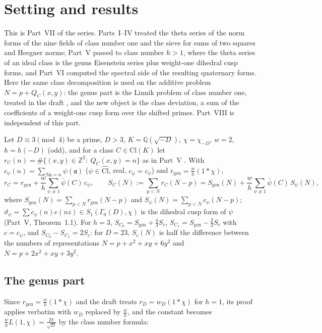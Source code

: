 \documentclass[11pt]{amsart}
\theoremstyle{remark}
\newcommand{\Z}{\mathbb Z}
\newcommand{\Q}{\mathbb Q}
\newcommand{\vt}{\vartheta}
\newcommand{\Cl}{\mathrm{Cl}}
\newcommand{\gen}{\mathrm{gen}}
\begin{document}
\begin{abstract}
$P_3$ according to the parity of $N$ and $\chi(2)$, unconditionally; only the problem for every individual $N$ remains.
\end{abstract}
\maketitle

\section{Setting and results}

This is Part~VII of the series. Parts~I--IV treated the theta series of the norm forms of the nine fields of class number one and the sieve for sums of two squares and Heegner norms; Part~V \cite{ChenV} passed to class number $h>1$, where the theta series of an ideal class is the genus Eisenstein series plus weight-one dihedral cusp forms, and Part~VI \cite{ChenVI} computed the spectral side of the resulting quaternary forms. Here the same class decomposition is used on the additive problem $N=p+Q_C(x,y)$: the genus part is the Linnik problem of class number one, treated in the draft \cite{ChenL}, and the new object is the class deviation, a sum of the coefficients of a weight-one cusp form over the shifted primes. Part~VIII \cite{ChenVIII} is independent of this part.


Let $D\equiv3\pmod4$ be a prime, $D>3$, $K=\Q(\sqrt{-D})$, $\chi=\chi_{-D}$, $w=2$, $h=h(-D)$ (odd), and for a class $C\in\Cl(K)$ let $r_C(n)=\#\{(x,y)\in\Z^2:\ Q_C(x,y)=n\}$ as in Part~V \cite{ChenV}. With $c_\psi(n)=\sum_{N\mathfrak a=n}\psi(\mathfrak a)$ ($\psi\in\widehat{\Cl}$, real, $c_{\bar\psi}=c_\psi$) and $r_\gen=\frac wh(1*\chi)$,
\begin{equation}\label{eq:dec}
r_C=r_\gen+\frac wh\sum_{\psi\ne1}\bar\psi(C)\,c_\psi,\qquad
S_C(N):=\sum_{p<N}r_C(N-p)=S_\gen(N)+\frac wh\sum_{\psi\ne1}\bar\psi(C)\,S_\psi(N),
\end{equation}
where $S_\gen(N)=\sum_{p<N}r_\gen(N-p)$ and $S_\psi(N)=\sum_{p<N}c_\psi(N-p)$; $\vt_\psi=\sum c_\psi(n)e(nz)\in S_1(\Gamma_0(D),\chi)$ is the dihedral cusp form of $\psi$ (Part~V, Theorem~1.1). For $h=3$, $S_{C_0}=S_\gen+\frac43S_c$, $S_{C_1}=S_\gen-\frac23S_c$ with $c=c_\psi$, and $S_{C_0}-S_{C_1}=2S_c$: for $D=23$, $S_c(N)$ is half the difference between the numbers of representations $N=p+x^2+xy+6y^2$ and $N=p+2x^2+xy+3y^2$.

\subsection{The genus part}
Since $r_\gen=\frac wh(1*\chi)$ and the draft \cite{ChenL} treats $r_D=w_D(1*\chi)$ for $h=1$, its proof applies verbatim with $w_D$ replaced by $\frac wh$, and the constant becomes $\frac whL(1,\chi)=\frac{2\pi}{\sqrt D}$ by the class number formula:
\end{document}
